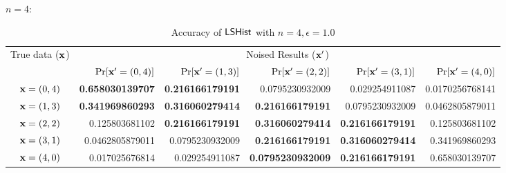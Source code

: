 \documentclass{article}
\begin{document}
\clearpage
$n = 4:$
\begin{table}[htbp]
	\scriptsize
	\centering
	\caption{Accuracy of $\mathsf{LSHist}$ with $n = 4, \epsilon = 1.0$}
	\label{tab_n4eps1prob_ilap}
\begin{tabular}{|c||r|r|r|r|r|}
	\hline

	\multirow{2}{*}{True data ($\textbf{x}$)}
								& \multicolumn{5}{c|}{Noised Results ($\textbf{x}'$)}  
								\\ \cline{2-6}
	                      		&  $\Pr[\textbf{x}' = (0, 4)]$  	
	                      		&  $\Pr[\textbf{x}' = (1, 3)]$ 	
	                      		&  $\Pr[\textbf{x}' = (2, 2)]$ 	
	                      		&  $\Pr[\textbf{x}' = (3, 1)]$ 	
	                      		&  $\Pr[\textbf{x}' = (4, 0)]$ 	
	                      		\\  \hline
	                      		\hline
	$\textbf{x} = (0,4)$          & {\bf 0.658030139707}	
								& {\bf 0.216166179191}	
								&  0.0795230932009
								&  0.029254911087
								&  0.0170256768141
								\\  \hline
	$\textbf{x} = (1,3)$          & {\bf 0.341969860293}	
								& {\bf 0.316060279414}			
								& {\bf 0.216166179191}
								&  0.0795230932009
								&  0.0462805879011
								\\  \hline
	$\textbf{x} = (2,2)$          & 0.125803681102
								& {\bf 0.216166179191}			
								& {\bf 0.316060279414}
								& {\bf 0.216166179191} 
								&  0.125803681102
								\\  \hline
	$\textbf{x} = (3,1)$          & 0.0462805879011
								& 0.0795230932009 			
								& {\bf 0.216166179191}
								& {\bf0.316060279414} 
								&  0.341969860293
								\\  \hline
	$\textbf{x} = (4,0)$          & 0.017025676814
								& 0.029254911087
								& {\bf 0.0795230932009}
								& {\bf 0.216166179191} 
								&  0.658030139707
								\\  \hline
\end{tabular}
\vspace{-0.5cm}
\end{table}
\end{document}
